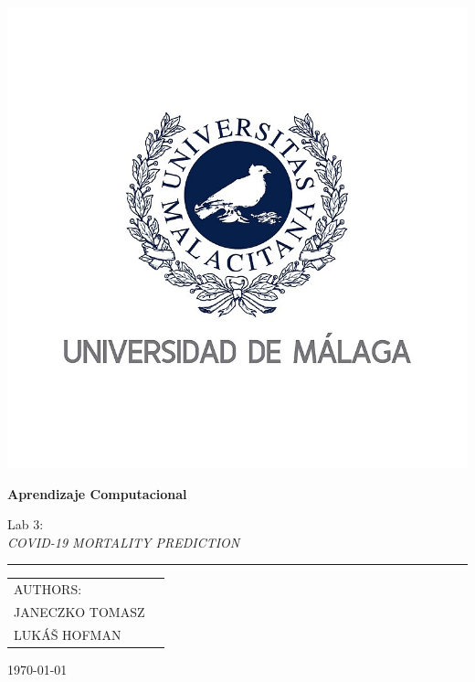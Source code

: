 \documentclass[runningheads]{llncs}
\begin{document}
\begin{titlepage}
\scshape
\centering
\includegraphics[scale=0.57]{logo.png} \par \vspace{0.1cm}
\huge 

{\huge{\textbf{Aprendizaje Computacional}}}\par \vspace{0.4cm}
Lab 3: \\ \textit{COVID-19 MORTALITY PREDICTION}
\rule{\textwidth}{2px}

\begin{tabularx}{\textwidth}{X r}
AUTHORS:\\
\large{JANECZKO TOMASZ}   & \\
\large{LUKÁŠ HOFMAN}   &  \\
\end{tabularx}
\vfill
\today

\end{titlepage}

\newpage

\end{document}
